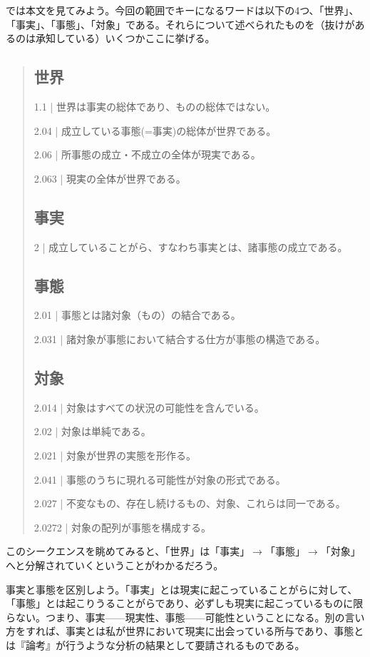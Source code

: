 \documentclass[a4paper,11pt]{jsarticle}
\begin{document}
では本文を見てみよう。今回の範囲でキーになるワードは以下の4つ、「世界」、「事実」、「事態」、「対象」である。それらについて述べられたものを（抜けがあるのは承知している）いくつかここに挙げる。

\begin{quote}
\subsection*{世界}
1.1 | 世界は事実の総体であり、ものの総体ではない。

2.04 | 成立している事態(=事実)の総体が世界である。

2.06 | 所事態の成立・不成立の全体が現実である。

2.063 | 現実の全体が世界である。

\subsection*{事実}
2 | 成立していることがら、すなわち事実とは、諸事態の成立である。
\subsection*{事態}
2.01 | 事態とは諸対象（もの）の結合である。

2.031 | 諸対象が事態において結合する仕方が事態の構造である。
\subsection*{対象}
2.014 | 対象はすべての状況の可能性を含んでいる。

2.02 | 対象は単純である。

2.021 | 対象が世界の実態を形作る。

2.041 | 事態のうちに現れる可能性が対象の形式である。

2.027 | 不変なもの、存在し続けるもの、対象、これらは同一である。

2.0272 | 対象の配列が事態を構成する。
\end{quote}

このシークエンスを眺めてみると、「世界」は「事実」$\rightarrow$「事態」$\rightarrow$「対象」へと分解されていくということがわかるだろう。

事実と事態を区別しよう。「事実」とは現実に起こっていることがらに対して、「事態」とは起こりうることがらであり、必ずしも現実に起こっているものに限らない。つまり、事実------現実性、事態------可能性ということになる。別の言い方をすれば、事実とは私が世界において現実に出会っている所与であり、事態とは『論考』が行うような分析の結果として要請されるものである。
\end{document}
